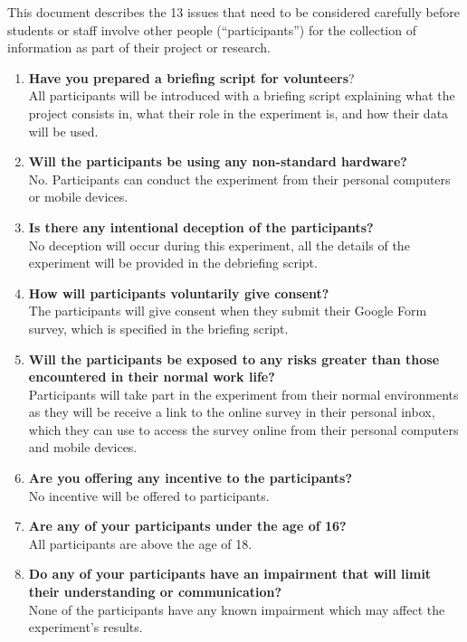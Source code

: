 This document describes the 13 issues that need to be considered carefully before students or staff  involve other people (“participants”) for the collection of information as part of their project or research.

\begin{enumerate}
    \item \textbf{Have you prepared a briefing script for volunteers}?\\
    All participants will be introduced with a briefing script explaining what the project consists in, what their role in the experiment is, and how their data will be used.
    \item \textbf{Will the participants be using any non-standard hardware?}\\
    No. Participants can conduct the experiment from their personal computers or mobile devices.
    \item \textbf{Is there any intentional deception of the participants?}\\
    No deception will occur during this experiment, all the details of the experiment will be provided in the debriefing script.
    \item \textbf{How will participants voluntarily give consent?}\\
    The participants will give consent when they submit their Google Form survey, which is specified in the briefing script.
    \item \textbf{Will the participants be exposed to any risks greater than those encountered in their normal work life?}\\
    Participants will take part in the experiment from their normal environments as they will be receive a link to the online survey in their personal inbox, which they can use to access the survey online from their personal computers and mobile devices.
    \item \textbf{Are you offering any incentive to the participants?}\\
    No incentive will be offered to participants.
    \item \textbf{Are any of your participants under the age of 16?}\\
    All participants are above the age of 18.
    \item \textbf{Do any of your participants have an impairment that will limit their understanding or communication?}\\
    None of the participants have any known impairment which may affect the experiment's results.

\end{enumerate}
